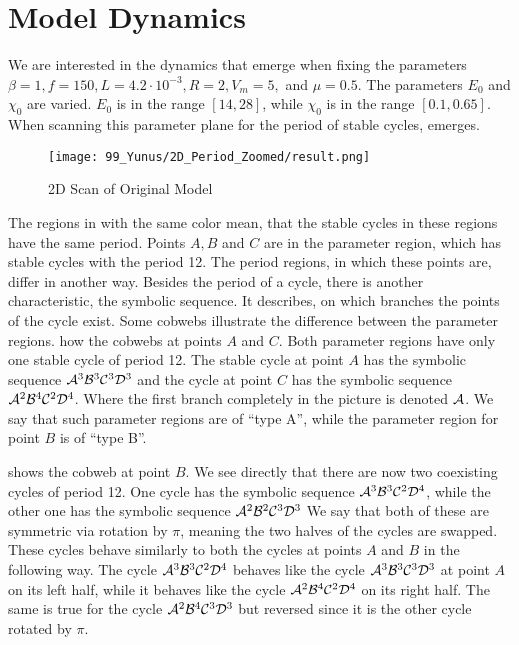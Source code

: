 \section{Model Dynamics}
\label{sec:og.dynamics}

We are interested in the dynamics that emerge when fixing the parameters $\beta = 1, f = 150, L = 4.2 \cdot 10^{-3}, R = 2, V_m = 5,$ and $\mu = 0.5$.
The parameters $E_0$ and $\chi_0$ are varied.
$E_0$ is in the range $[14, 28]$, while $\chi_0$ is in the range $[0.1, 0.65]$.
When scanning this parameter plane for the period of stable cycles,  emerges.

\begin{figure}
    \centering
    \texttt{[image: 99\_Yunus/2D\_Period\_Zoomed/result.png]}
    \caption{2D Scan of Original Model}
    \label{fig:yunus.2pi.2d.full}
\end{figure}

The regions in  with the same color mean, that the stable cycles in these regions have the same period.
Points $A, B$ and $C$ are in the parameter region, which has stable cycles with the period 12.
The period regions, in which these points are, differ in another way.
Besides the period of a cycle, there is another characteristic, the symbolic sequence.
It describes, on which branches the points of the cycle exist.
Some cobwebs illustrate the difference between the parameter regions.
 how the cobwebs at points $A$ and $C$.
Both parameter regions have only one stable cycle of period 12.
The stable cycle at point $A$ has the symbolic sequence $\mathcal{A}^3\mathcal{B}^3\mathcal{C}^3\mathcal{D}^3$ and the cycle at point $C$ has the symbolic sequence $\mathcal{A}^2\mathcal{B}^4\mathcal{C}^2\mathcal{D}^4$.
Where the first branch completely in the picture is denoted $\mathcal{A}$.
We say that such parameter regions are of ``type A'', while the parameter region for point $B$ is of ``type B''.

 shows the cobweb at point $B$.
We see directly that there are now two coexisting cycles of period 12.
One cycle has the symbolic sequence $\mathcal{A}^3\mathcal{B}^3\mathcal{C}^2\mathcal{D}^4$, while the other one has the symbolic sequence $\mathcal{A}^2\mathcal{B}^2\mathcal{C}^3\mathcal{D}^3$
We say that both of these are symmetric via rotation by $\pi$, meaning the two halves of the cycles are swapped.
These cycles behave similarly to both the cycles at points $A$ and $B$ in the following way.
The cycle $\mathcal{A}^3\mathcal{B}^3\mathcal{C}^2\mathcal{D}^4$ behaves like the cycle $\mathcal{A}^3\mathcal{B}^3\mathcal{C}^3\mathcal{D}^3$ at point $A$ on its left half, while it behaves like the cycle $\mathcal{A}^2\mathcal{B}^4\mathcal{C}^2\mathcal{D}^4$ on its right half.
The same is true for the cycle $\mathcal{A}^2\mathcal{B}^4\mathcal{C}^3\mathcal{D}^3$ but reversed since it is the other cycle rotated by $\pi$.

